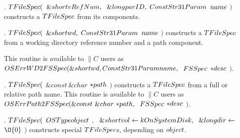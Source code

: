 \fi

. \CD{}$\\{TFileSpec}($ $\&{short}\ \\{vRefNum},\;\ \&{long}\ \\{parID},\;%
\ \\{ConstStr31Param}$ $\\{name}$ $)$\DC{}
constructs a \CD{}$\\{TFileSpec}$\DC{} from its components.

\fi

. \CD{}$\\{TFileSpec}($ $\&{short}\ \\{wd},\;\ \\{ConstStr31Param}$ $%
\\{name}$ $)$\DC{} constructs
a \CD{}$\\{TFileSpec}$\DC{} from a working directory reference number and a
path component.

This routine is available to \CD{}$\|C$\DC{} users as
\CD{}$\\{OSErr}\ \\{WD2FSSpec}(\&{short}\ \\{wd},\;\\{ConstStr31Param}\ %
\\{name},\;$ $\\{FSSpec}$ ${{*}}\\{desc}$ $)$\DC{}.

\fi

. \CD{}$\\{TFileSpec}($ $\&{const}\ \&{char}$ ${{*}}\\{path}$ $)$\DC{}
constructs a
\CD{}$\\{TFileSpec}$\DC{} from a full or relative path name.
This routine is available to \CD{}$\|C$\DC{} users as
\CD{}$\\{OSErr}\ \\{Path2FSSpec}(\&{const}\ \&{char}\ {*}\\{path},\;$ $%
\\{FSSpec}$ ${{*}}\\{desc}$ $)$\DC{}.

\fi

. \CD{}$\\{TFileSpec}($ $\\{OSType}\ \\{object}$ $,\;$ $\&{short}\ \\{vol}%
\leftarrow\\{kOnSystemDisk},\;\ \&{long}\ \\{dir}\leftarrow$ $\O{0}$ $)$\DC{}
constructs
special \CD{}$\\{TFileSpec}$\DC{}s, depending on \CD{}$\\{object}$\DC{}.

